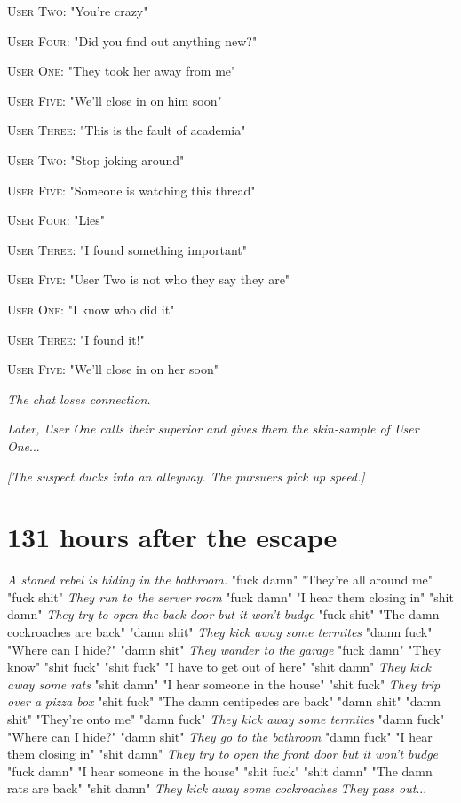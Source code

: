 \documentclass{report}
\begin{document}
\textsc{User Two}: "You're crazy" 

\textsc{User Four}: "Did you find out anything new?" 

\textsc{User One}: "They took her away from me" 

\textsc{User Five}: "We'll close in on him soon" 

\textsc{User Three}: "This is the fault of academia" 

\textsc{User Two}: "Stop joking around" 

\textsc{User Five}: "Someone is watching this thread" 

\textsc{User Four}: "Lies" 

\textsc{User Three}: "I found something important" 

\textsc{User Five}: "User Two is not who they say they are" 

\textsc{User One}: "I know who did it" 

\textsc{User Three}: "I found it!" 

\textsc{User Five}: "We'll close in on her soon" 

\textit{The chat loses connection}. 

\textit{Later, User One calls their superior and gives them the skin-sample of User One}...

\textit{[The suspect ducks into an alleyway. The pursuers pick up speed.]}


\section*{131 \small{hours after the escape}}

\textit{A stoned rebel is hiding in the bathroom.} "fuck damn" "They're all around me" "fuck shit" \textit{They run to the server room} "fuck damn" "I hear them closing in" "shit damn" \textit{They try to open the back door but it won't budge} "fuck shit" "The damn cockroaches are back" "damn shit" \textit{They kick away some termites} "damn fuck" "Where can I hide?" "damn shit" \textit{They wander to the garage} "fuck damn" "They know" "shit fuck" \textit{} "shit fuck" "I have to get out of here" "shit damn" \textit{They kick away some rats} "shit damn" "I hear someone in the house" "shit fuck" \textit{They trip over a pizza box} "shit fuck" "The damn centipedes are back" "damn shit" \textit{} "damn shit" "They're onto me" "damn fuck" \textit{They kick away some termites} "damn fuck" "Where can I hide?" "damn shit" \textit{They go to the bathroom} "damn fuck" "I hear them closing in" "shit damn" \textit{They try to open the front door but it won't budge} "fuck damn" "I hear someone in the house" "shit fuck" \textit{} "shit damn" "The damn rats are back" "shit damn" \textit{They kick away some cockroaches} \textit{They pass out}...
\end{document}
